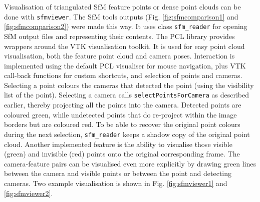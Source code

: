 Visualisation of triangulated SfM feature points or dense point clouds can be done with \texttt{sfmviewer}. The SfM tools outputs (Fig. \ref{fig:sfmcomparison1} and \ref{fig:sfmcomparison2}) were made this way. It uses class \texttt{sfm\_reader} for opening SfM output files and representing their contents. The PCL library provides wrappers around the VTK visualisation toolkit. It is used for easy point cloud visualisation, both the feature point cloud and camera poses. Interaction is implemented using the default PCL visualiser for mouse navigation, plus VTK call-back functions for custom shortcuts, and selection of points and cameras. Selecting a point colours the cameras that detected the point (using the visibility list of the point). Selecting a camera calls \texttt{selectPointsForCamera} as described earlier, thereby projecting all the points into the camera. Detected points are coloured green, while undetected points that do re-project within the image borders but are coloured red. To be able to recover the original point colours during the next selection, \texttt{sfm\_reader} keeps a shadow copy of the original point cloud. Another implemented feature is the ability to visualise those visible (green) and invisible (red) points onto the original corresponding frame. The camera-feature pairs can be visualised even more explicitly by drawing green lines between the camera and visible points or between the point and detecting cameras. Two example visualisation is shown in Fig. \ref{fig:sfmviewer1} and \ref{fig:sfmviewer2}.

